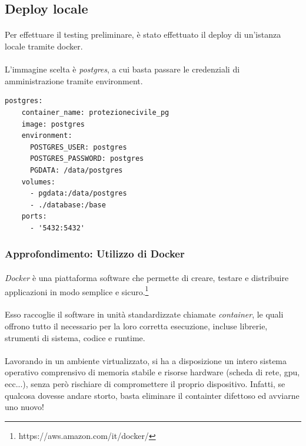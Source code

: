 \documentclass[11pt,a4paper,english]{article}
\begin{document}
\subsection{Deploy locale}

\paragraph{} Per effettuare il testing preliminare, è stato effettuato il deploy di un'istanza locale tramite docker. 

\paragraph{} L'immagine scelta è \emph{postgres}, a cui basta passare le credenziali di amministrazione tramite environment. 

\begin{lstlisting}[caption=Configurazione di docker compose per postgres]
postgres:
    container_name: protezionecivile_pg
    image: postgres
    environment:
      POSTGRES_USER: postgres
      POSTGRES_PASSWORD: postgres
      PGDATA: /data/postgres
    volumes:
      - pgdata:/data/postgres
      - ./database:/base
    ports:
      - '5432:5432'
\end{lstlisting}


\subsubsection{Approfondimento: Utilizzo di Docker}

\paragraph{} \emph{Docker} \cite{docker} è una piattaforma software che permette di creare, testare e distribuire applicazioni in modo semplice e sicuro.\footnote{https://aws.amazon.com/it/docker/} 

\paragraph{} Esso raccoglie il software in unità standardizzate chiamate \emph{container}, le quali offrono tutto il necessario per la loro corretta esecuzione, incluse librerie, strumenti di sistema, codice e runtime. 

\paragraph{} Lavorando in un ambiente virtualizzato, si ha a disposizione un intero sistema operativo comprensivo di memoria stabile e risorse hardware (scheda di rete, gpu, ecc...), senza però rischiare di compromettere il proprio dispositivo. Infatti, se qualcosa dovesse andare storto, basta eliminare il containter difettoso ed avviarne uno nuovo!
\end{document}
